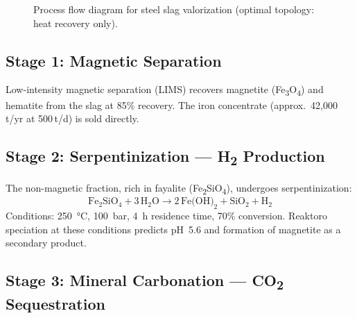 \documentclass[11pt,a4paper]{article}
\begin{document}
\begin{figure}[H]
\caption{Process flow diagram for steel slag valorization (optimal topology: heat recovery only).}
\label{fig:pfd}
\end{figure}

\subsection{Stage 1: Magnetic Separation}

Low-intensity magnetic separation (LIMS) recovers magnetite
(Fe\textsubscript{3}O\textsubscript{4}) and hematite from the slag at 85\% recovery.
The iron concentrate (approx.\ 42,000\,t/yr at 500\,t/d) is sold directly.

\subsection{Stage 2: Serpentinization — H\textsubscript{2} Production}

The non-magnetic fraction, rich in fayalite (Fe\textsubscript{2}SiO\textsubscript{4}),
undergoes serpentinization:
\begin{equation}
    \text{Fe}_2\text{SiO}_4 + 3\,\text{H}_2\text{O}
    \longrightarrow
    2\,\text{Fe(OH)}_2 + \text{SiO}_2 + \text{H}_2
    \label{eq:serp}
\end{equation}
Conditions: \SI{250}{\celsius}, \SI{100}{bar}, \SI{4}{h} residence time, 70\% conversion.
Reaktoro speciation at these conditions predicts pH~5.6 and formation of magnetite as a
secondary product.

\subsection{Stage 3: Mineral Carbonation — CO\textsubscript{2} Sequestration}
\end{document}
